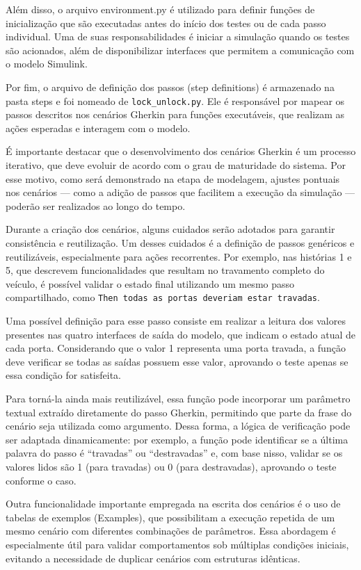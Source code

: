 Além disso, o arquivo environment.py é utilizado para definir funções de inicialização que são executadas antes do início dos testes ou de cada passo individual. 
Uma de suas responsabilidades é iniciar a simulação quando os testes são acionados, além de disponibilizar interfaces que permitem a comunicação com o modelo Simulink.

Por fim, o arquivo de definição dos passos (step definitions) é armazenado na pasta steps e foi nomeado de \texttt{lock\_unlock.py}. Ele é responsável por mapear os 
passos descritos nos cenários Gherkin para funções executáveis, que realizam as ações esperadas e interagem com o modelo.

É importante destacar que o desenvolvimento dos cenários Gherkin é um processo iterativo, que deve evoluir de acordo com o grau de maturidade do sistema. 
Por esse motivo, como será demonstrado na etapa de modelagem, ajustes pontuais nos cenários — como a adição de passos que facilitem a execução da simulação — 
poderão ser realizados ao longo do tempo.

Durante a criação dos cenários, alguns cuidados serão adotados para garantir consistência e reutilização. Um desses cuidados é a definição de passos genéricos 
e reutilizáveis, especialmente para ações recorrentes. Por exemplo, nas histórias 1 e 5, que descrevem funcionalidades que resultam no travamento completo do 
veículo, é possível validar o estado final utilizando um mesmo passo compartilhado, como \texttt{Then todas as portas deveriam estar travadas}.

Uma possível definição para esse passo consiste em realizar a leitura dos valores presentes nas quatro interfaces de saída do modelo, que indicam o estado atual 
de cada porta. Considerando que o valor 1 representa uma porta travada, a função deve verificar se todas as saídas possuem esse valor, aprovando o teste apenas se 
essa condição for satisfeita.

Para torná-la ainda mais reutilizável, essa função pode incorporar um parâmetro textual extraído diretamente do passo Gherkin, permitindo que parte da frase do 
cenário seja utilizada como argumento. Dessa forma, a lógica de verificação pode ser adaptada dinamicamente: por exemplo, a função pode identificar se a última 
palavra do passo é “travadas” ou “destravadas” e, com base nisso, validar se os valores lidos são 1 (para travadas) ou 0 (para destravadas), aprovando o teste 
conforme o caso.

Outra funcionalidade importante empregada na escrita dos cenários é o uso de tabelas de exemplos (Examples), que possibilitam a execução repetida de um mesmo 
cenário com diferentes combinações de parâmetros. Essa abordagem é especialmente útil para validar comportamentos sob múltiplas condições iniciais, evitando a 
necessidade de duplicar cenários com estruturas idênticas.

